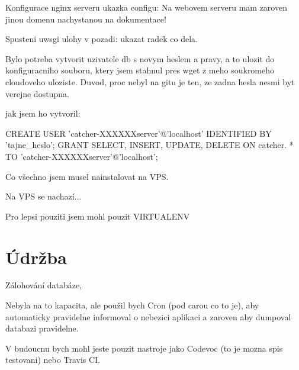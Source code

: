 Konfigurace nginx serveru ukazka configu:
Na webovem serveru mam zaroven jinou domenu nachystanou na dokumentace!

Spusteni uwsgi ulohy v pozadi: ukazat radek co dela.

Bylo potreba vytvorit uzivatele db s novym heslem a pravy, a to ulozit do konfiguracniho souboru, ktery jsem stahnul pres wget z meho soukromeho cloudoveho uloziste. Duvod, proc nebyl na gitu je ten, ze zadna hesla nesmi byt verejne dostupna. 

jak jsem ho vytvoril:

CREATE USER 'catcher-XXXXXXserver'@'localhost' IDENTIFIED BY 'tajne_heslo';
GRANT SELECT, INSERT, UPDATE, DELETE ON catcher. * TO 'catcher-XXXXXXserver'@'localhost';


Co všechno jsem musel nainstalovat na VPS.

Na VPS se nachazí...

Pro lepsi pouziti jsem mohl pouzit VIRTUALENV


\section{Údržba}

Zálohování databáze,

Nebyla na to kapacita, ale použil bych Cron (pod carou co to je), aby automaticky pravidelne informoval o nebezici aplikaci a zaroven aby dumpoval databazi pravidelne.

V budoucnu bych mohl jeste pouzit nastroje jako Codevoc (to je mozna spis testovani) nebo Travis CI.

